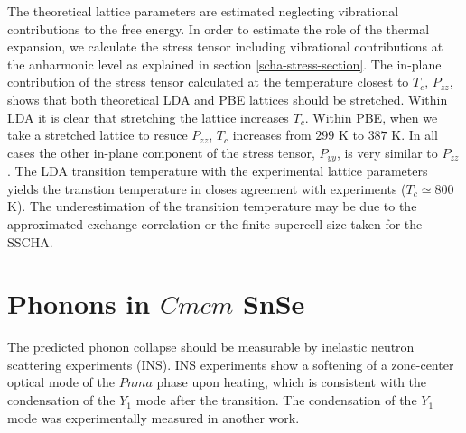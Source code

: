 The theoretical lattice parameters are estimated neglecting vibrational 
contributions to the free energy. In order to estimate the role of the thermal expansion, we calculate the stress tensor including vibrational contributions at the anharmonic level as explained in 
section \ref{scha-stress-section}. The in-plane contribution of the stress tensor calculated at the temperature closest to $T_{c}$, $P_{zz}$, shows that both theoretical LDA and PBE lattices should be stretched. Within LDA it 
is clear that stretching the lattice increases $T_{c}$. Within PBE, when we take a stretched lattice to resuce $P_{zz}$, $T_{c}$ increases from $299$ K to $387$ K. In all cases the other in-plane component of the stress tensor, 
$P_{yy}$, is very similar to $P_{zz}$. The LDA transition temperature with the experimental lattice parameters yields the transtion temperature in closes agreement with experiments ($T_{c}\simeq800$ K). The underestimation of the 
transition temperature may be due to the approximated exchange-correlation or the finite supercell size taken for the SSCHA. \\

\section{Phonons in $Cmcm$ SnSe}

The predicted phonon collapse should be measurable by inelastic neutron scattering experiments (INS). INS experiments\cite{li2015orbitally} show a softening of a zone-center optical mode of the $Pnma$ phase upon heating, which
is consistent with the condensation of the $Y_{1}$ mode after the transition. The condensation of the $Y_{1}$ mode 
was experimentally measured in another work\cite{chatterji2018soft}. \\

